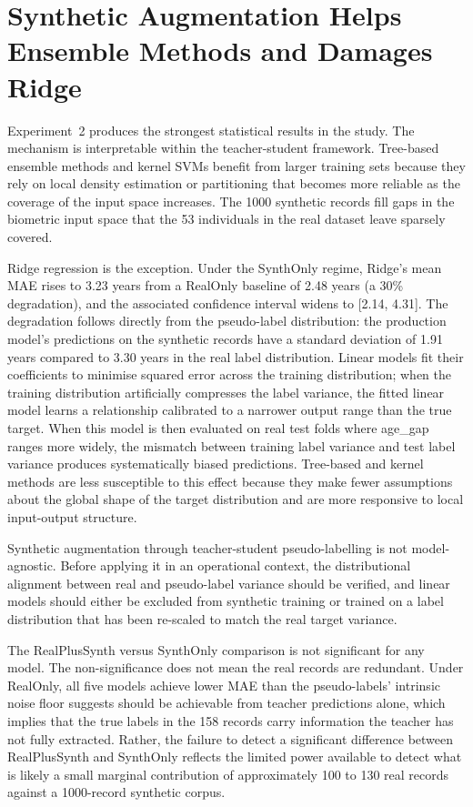 \documentclass[11pt,a4paper]{report}
\begin{document}
\section{Synthetic Augmentation Helps Ensemble Methods and Damages Ridge}

Experiment~2 produces the strongest statistical results in the study. The mechanism is interpretable
within the teacher-student framework. Tree-based ensemble methods and kernel SVMs benefit from
larger training sets because they rely on local density estimation or partitioning that becomes more
reliable as the coverage of the input space increases. The 1000 synthetic records fill gaps in the
biometric input space that the 53 individuals in the real dataset leave sparsely covered.

Ridge regression is the exception. Under the SynthOnly regime, Ridge's mean MAE rises to 3.23 years
from a RealOnly baseline of 2.48 years (a 30\% degradation), and the associated confidence
interval widens to [2.14, 4.31]. The degradation follows directly from the pseudo-label distribution: the production model's predictions on the synthetic records have a standard deviation
of 1.91 years compared to 3.30 years in the real label distribution. Linear models fit their
coefficients to minimise squared error across the training distribution; when the training
distribution artificially compresses the label variance, the fitted linear model learns a
relationship calibrated to a narrower output range than the true target. When this model is then
evaluated on real test folds where age\_gap ranges more widely, the mismatch between training label
variance and test label variance produces systematically biased predictions. Tree-based and kernel
methods are less susceptible to this effect because they make fewer assumptions about the global
shape of the target distribution and are more responsive to local input-output structure.

Synthetic augmentation through teacher-student pseudo-labelling is not model-agnostic. Before applying it in an operational context, the
distributional alignment between real and pseudo-label variance should be verified, and linear
models should either be excluded from synthetic training or trained on a label distribution that
has been re-scaled to match the real target variance.

The RealPlusSynth versus SynthOnly comparison is not significant for any model. The non-significance does not mean the real records are redundant. Under RealOnly, all five models achieve
lower MAE than the pseudo-labels' intrinsic noise floor suggests should be achievable from teacher
predictions alone, which implies that the true labels in the 158 records carry information the
teacher has not fully extracted. Rather, the failure to detect a significant difference between
RealPlusSynth and SynthOnly reflects the limited power available to detect what is likely a small
marginal contribution of approximately 100 to 130 real records against a 1000-record synthetic
corpus.
\end{document}

